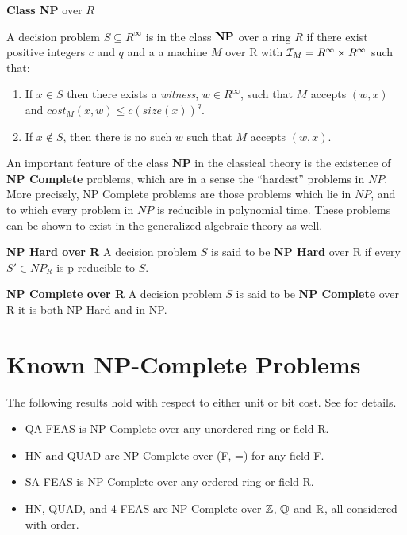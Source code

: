\begin{definition}{\textbf{Class NP} over $R$}
  \label{def:np}
  
  A decision problem $S \subseteq R^\infty$ is in the class $\mathbf{NP}$
  over a ring $R$ if there exist positive integers $c$ and $q$ and a a
  machine $M$ over R with $\mathcal{I}_M = R^\infty \times R^\infty$ such
  that:

  \begin{enumerate}
  \item If $x \in S$ then there exists a \emph{witness}, $w \in
    R^\infty$, such that $M$ accepts $(w, x)$ and $cost_M(x,w) \leq
    c(size(x))^q$.
  \item If $x \notin S$, then there is no such $w$ such that $M$
    accepts $(w, x)$.
  \end{enumerate}
\end{definition}

An important feature of the class $\mathbf{NP}$ in the classical
theory is the existence of \textbf{NP Complete} problems, which are in
a sense the ``hardest'' problems in $NP$.  More precisely, NP Complete
problems are those problems which lie in $NP$, and to which every
problem in $NP$ is reducible in polynomial time.  These problems can
be shown to exist in the generalized algebraic theory as well.

\begin{definition}{\textbf{NP Hard over R}}
  A decision problem $S$ is said to be \textbf{NP Hard} over R if
  every $S' \in NP_R$ is p-reducible to $S$.
\end{definition}

\begin{definition}{\textbf{NP Complete over R}}
  A decision problem $S$ is said to be \textbf{NP Complete} over R it
  is both NP Hard and in NP.
\end{definition}

\section{Known NP-Complete Problems}

The following results hold with respect to either unit or bit cost.
See \cite{B98} for details.  


\begin{itemize}
\item QA-FEAS is NP-Complete over any unordered ring or field R.
\item HN and QUAD are NP-Complete over (F, =) for any field F.
\item SA-FEAS is NP-Complete over any ordered ring or field R.
\item HN, QUAD, and 4-FEAS are NP-Complete over $\mathbb{Z}$,
  $\mathbb{Q}$ and $\mathbb{R}$, all considered with order.
\end{itemize}

